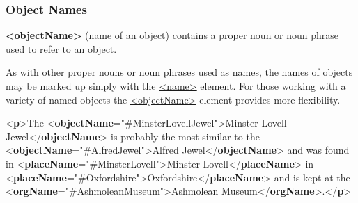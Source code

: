 \subsubsection[{Object Names}]{Object Names}\label{NDOBJN}\par

\begin{sansreflist}
  
\item [\textbf{<objectName>}] (name of an object) contains a proper noun or noun phrase used to refer to an object.
\end{sansreflist}
\par
As with other proper nouns or noun phrases used as names, the names of objects may be marked up simply with the \hyperref[TEI.name]{<name>} element. For those working with a variety of named objects the \hyperref[TEI.objectName]{<objectName>} element provides more flexibility. \par\bgroup{}\exampleFont \begin{shaded}\noindent\mbox{}{<\textbf{p}>}The {<\textbf{objectName}\hspace*{1em}{ref}="{\#MinsterLovellJewel}">}Minster Lovell Jewel{</\textbf{objectName}>} is probably the most similar to the\mbox{}\newline 
{<\textbf{objectName}\hspace*{1em}{ref}="{\#AlfredJewel}">}Alfred Jewel{</\textbf{objectName}>} and was found in {<\textbf{placeName}\hspace*{1em}{ref}="{\#MinsterLovell}">}Minster\mbox{}\newline 
\hspace*{1em}\hspace*{1em} Lovell{</\textbf{placeName}>} in {<\textbf{placeName}\hspace*{1em}{ref}="{\#Oxfordshire}">}Oxfordshire{</\textbf{placeName}>} and is kept at the {<\textbf{orgName}\hspace*{1em}{ref}="{\#AshmoleanMuseum}">}Ashmolean Museum{</\textbf{orgName}>}.{</\textbf{p}>}\end{shaded}\egroup\par \par

